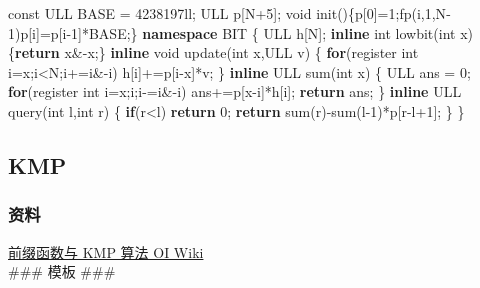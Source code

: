 \documentclass[
]{article}
\newenvironment{Shaded}{}{}
\newcommand{\AttributeTok}[1]{\textcolor[rgb]{0.49,0.56,0.16}{#1}}
\newcommand{\BuiltInTok}[1]{#1}
\newcommand{\ControlFlowTok}[1]{\textcolor[rgb]{0.00,0.44,0.13}{\textbf{#1}}}
\newcommand{\DataTypeTok}[1]{\textcolor[rgb]{0.56,0.13,0.00}{#1}}
\newcommand{\DecValTok}[1]{\textcolor[rgb]{0.25,0.63,0.44}{#1}}
\newcommand{\KeywordTok}[1]{\textcolor[rgb]{0.00,0.44,0.13}{\textbf{#1}}}
\newcommand{\NormalTok}[1]{#1}
\begin{document}
\begin{Shaded}
\begin{Highlighting}[]
\AttributeTok{const}\NormalTok{ ULL BASE = }\DecValTok{4238197}\BuiltInTok{ll}\NormalTok{;}
\NormalTok{ULL p[N+}\DecValTok{5}\NormalTok{];}
\DataTypeTok{void}\NormalTok{ init()\{p[}\DecValTok{0}\NormalTok{]=}\DecValTok{1}\NormalTok{;fp(i,}\DecValTok{1}\NormalTok{,N{-}}\DecValTok{1}\NormalTok{)p[i]=p[i{-}}\DecValTok{1}\NormalTok{]*BASE;\}}
\KeywordTok{namespace}\NormalTok{ BIT}
\NormalTok{\{}
\NormalTok{    ULL h[N];}
    \KeywordTok{inline} \DataTypeTok{int}\NormalTok{ lowbit(}\DataTypeTok{int}\NormalTok{ x)\{}\ControlFlowTok{return}\NormalTok{ x\&{-}x;\}}
    \KeywordTok{inline} \DataTypeTok{void}\NormalTok{ update(}\DataTypeTok{int}\NormalTok{ x,ULL v)}
\NormalTok{    \{}
        \ControlFlowTok{for}\NormalTok{(}\AttributeTok{register} \DataTypeTok{int}\NormalTok{ i=x;i\textless{}N;i+=i\&{-}i)}
\NormalTok{            h[i]+=p[i{-}x]*v;}
\NormalTok{    \}}
    \KeywordTok{inline}\NormalTok{ ULL sum(}\DataTypeTok{int}\NormalTok{ x)}
\NormalTok{    \{}
\NormalTok{        ULL ans = }\DecValTok{0}\NormalTok{;}
        \ControlFlowTok{for}\NormalTok{(}\AttributeTok{register} \DataTypeTok{int}\NormalTok{ i=x;i;i{-}=i\&{-}i)}
\NormalTok{            ans+=p[x{-}i]*h[i];}
        \ControlFlowTok{return}\NormalTok{ ans;}
\NormalTok{    \}}
    \KeywordTok{inline}\NormalTok{ ULL query(}\DataTypeTok{int}\NormalTok{ l,}\DataTypeTok{int}\NormalTok{ r)}
\NormalTok{    \{}
        \ControlFlowTok{if}\NormalTok{(r\textless{}l) }\ControlFlowTok{return} \DecValTok{0}\NormalTok{;}
        \ControlFlowTok{return}\NormalTok{ sum(r){-}sum(l{-}}\DecValTok{1}\NormalTok{)*p[r{-}l+}\DecValTok{1}\NormalTok{];}
\NormalTok{    \}}
\NormalTok{\}}
\end{Highlighting}
\end{Shaded}

\hypertarget{kmp}{%
\subsection{KMP}\label{kmp}}

\hypertarget{ux8d44ux6599-2}{%
\subsubsection{资料}\label{ux8d44ux6599-2}}

\href{https://oi-wiki.org/string/kmp/}{前缀函数与 KMP 算法 OI Wiki\\
} \#\#\# 模板 \#\#\#
\end{document}
